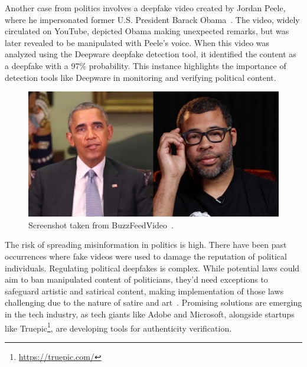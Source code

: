 Another case from politics involves a deepfake video created by Jordan Peele, where he
impersonated former U.S. President Barack Obama~\cite{peele,10.1145/3371409}. The video, widely
circulated on YouTube, depicted Obama making unexpected remarks, but was later revealed to be
manipulated with Peele's voice. When this video was analyzed using the Deepware deepfake
detection tool, it identified the content as a deepfake with a 97\% probability. This instance
highlights the importance of detection tools like Deepware in monitoring and verifying
political content.

\begin{figure}[ht]
	\centering
	\includegraphics[width=0.75\columnwidth]{figures/obama}
	\caption{Screenshot taken from BuzzFeedVideo~\cite{peele}.}\label{obama-youtube}
\end{figure}

The risk of spreading misinformation in politics is high. There have been past
occurrences where fake videos were used to damage the reputation of political individuals.
Regulating political deepfakes is complex. While potential laws could aim to ban manipulated
content of politicians, they'd need exceptions to safeguard artistic and satirical content,
making implementation of those laws challenging due to the nature of satire and art~\cite{politics,vanity-fair}.
Promising solutions are emerging in the tech industry, as tech giants like Adobe and Microsoft,
alongside startups like Truepic\footnote{\url{https://truepic.com/}}, are developing tools for
authenticity verification.
